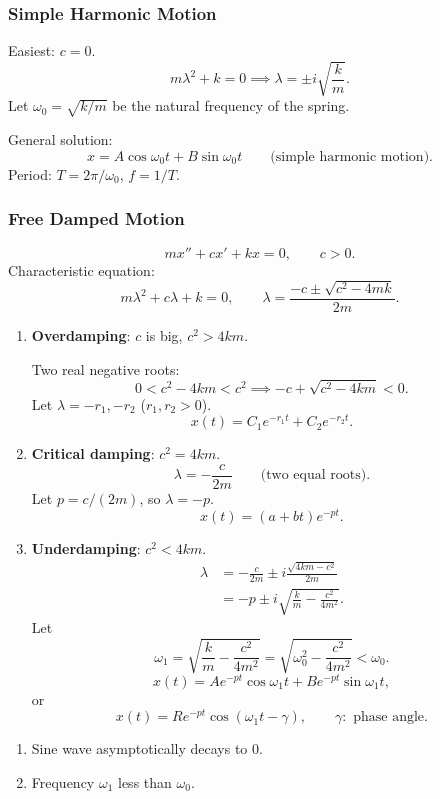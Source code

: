 \subsubsection{Simple Harmonic Motion}

Easiest: $c=0$.
\[
  m\lambda^2+k=0\implies\lambda=\pm i\sqrt{\frac{k}{m}}.
\]
Let $\omega_0=\sqrt{k/m}$ be the natural frequency of the spring.

General solution:
\[
  x=A\cos\omega_0t+B\sin\omega_0t
  \qquad\text{(simple harmonic motion).}
\]
Period: $T=2\pi/\omega_0$, $f=1/T$.

\subsubsection{Free Damped Motion}

\[
  mx''+cx'+kx=0,\qquad c>0.
\]
Characteristic equation:
\[
  m\lambda^2+c\lambda+k=0,
  \qquad\lambda=\frac{-c\pm\sqrt{c^2-4mk}}{2m}.
\]
\begin{enumerate}
  \item \textbf{Overdamping}: $c$ is big, $c^2>4km$.

        Two real negative roots:
        \[
          0<c^2-4km<c^2\implies-c+\sqrt{c^2-4km}<0.
        \]
        Let $\lambda=-r_1,-r_2$ ($r_1,r_2>0$).
        \[
          x(t)=C_1e^{-r_1t}+C_2e^{-r_2t}.
        \]
  \item \textbf{Critical damping}: $c^2=4km$.
        \[
          \lambda=-\frac{c}{2m}\qquad\text{(two equal roots).}
        \]
        Let $p=c/(2m)$, so $\lambda=-p$.
        \[
          x(t)=(a+bt)e^{-pt}.
        \]
  \item \textbf{Underdamping}: $c^2<4km$.
        \begin{align*}
          \lambda & =-\frac{c}{2m}\pm i\frac{\sqrt{4km-c^2}}{2m} \\
                  & =-p\pm i\sqrt{\frac{k}{m}-\frac{c^2}{4m^2}}.
        \end{align*}
        Let
        \[
          \omega_1=\sqrt{\frac{k}{m}-\frac{c^2}{4m^2}}
          =\sqrt{\omega_0^2-\frac{c^2}{4m^2}}<\omega_0.
        \]
        \[
          x(t)=Ae^{-pt}\cos\omega_1t+Be^{-pt}\sin\omega_1t,
        \]
        or
        \[
          x(t)=Re^{-pt}\cos(\omega_1t-\gamma),
          \qquad\gamma:\text{ phase angle}.
        \]
\end{enumerate}
\begin{center}
\end{center}
\begin{enumerate}
  \item Sine wave asymptotically decays to $0$.
  \item Frequency $\omega_1$ less than $\omega_0$.
\end{enumerate}

